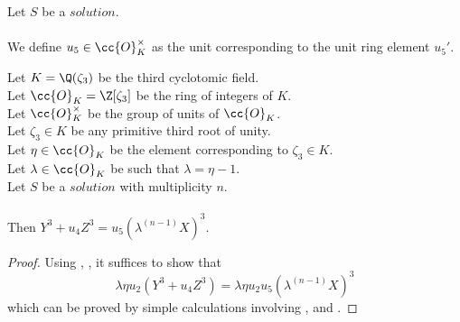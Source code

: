 \begin{definition}[$u_5$]
  \label{def:Solution_u5}
  \leanok
  Let $S$ be a $solution$.\\\\
  We define $u_5 \in \cc{O}^\times_K$ as the unit corresponding
  to the unit ring element $u_5'$.
\end{definition}

\begin{lemma}
  \label{lmm:formula2}
  \leanok
  Let $K = \Q(\zeta_3)$ be the third cyclotomic field. \\
  Let $\cc{O}_K = \Z[\zeta_3]$ be the ring of integers of $K$. \\
  Let $\cc{O}^\times_K$ be the group of units of $\cc{O}_K$. \\
  Let $\zeta_3 \in K$ be any primitive third root of unity. \\
  Let $\eta \in \cc{O}_K$ be the element corresponding to $\zeta_3 \in K$. \\
  Let $\lambda \in \cc{O}_K$ be such that $\lambda = \eta -1$. \\
  Let $S$ be a $solution$ with multiplicity $n$.\\\\
  Then $Y^3 + u_4 Z^3 = u_5 (\lambda^(n-1) X)^3$.
\end{lemma}
\begin{proof}
  \leanok
  Using , , it suffices to show that
  $$\lambda \eta u_2 (Y^3 + u_4 Z^3) = \lambda \eta u_2 u_5 (\lambda^(n-1) X)^3$$
  which can be proved by simple calculations involving ,
   and .
\end{proof}

